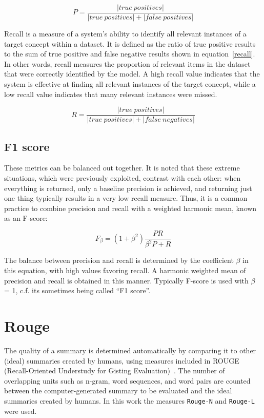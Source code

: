 \begin{equation}
    P = \frac{|true~positives|}{|true~positives| + |false~positives|}\label{precision}
\end{equation}

Recall is a measure of a system's ability to identify all relevant instances of a target concept within a dataset. It is defined as the ratio of true positive results to the sum of true positive and false negative results shown in equation~\ref{recall}. In other words, recall measures the proportion of relevant items in the dataset that were correctly identified by the model. A high recall value indicates that the system is effective at finding all relevant instances of the target concept, while a low recall value indicates that many relevant instances were missed.

\begin{equation}
    R = \frac{|true~positives|}{|true~positives| + |false~negatives|}\label{recall}
\end{equation}

\subsection*{F1 score}
These metrics can be balanced out together. It is noted that these extreme situations, which were previously exploited, contrast with each other: when everything is returned, only a baseline precision is achieved, and returning just one thing typically results in a very low recall measure. Thus, it is a common practice to combine precision and recall with a weighted harmonic mean, known as an F-score:

\begin{equation}
    F_\beta = (1 + \beta^2)\frac{PR}{\beta^2P + R}
\end{equation}

The balance between precision and recall is determined by the coefficient $\beta$ in this equation, with high values favoring recall. A harmonic weighted mean of precision and recall is obtained in this manner. Typically F-score is used with $\beta$ = 1, c.f. its sometimes being called ``F1 score''.

\section{Rouge}
The quality of a summary is determined automatically by comparing it to other (ideal) summaries created by humans, using measures included in ROUGE (Recall-Oriented Understudy for Gisting Evaluation)~\cite{rouge}. The number of overlapping units such as n-gram, word sequences, and word pairs are counted between the computer-generated summary to be evaluated and the ideal summaries created by humans. In this work the measures \texttt{Rouge-N} and \texttt{Rouge-L} were used.

